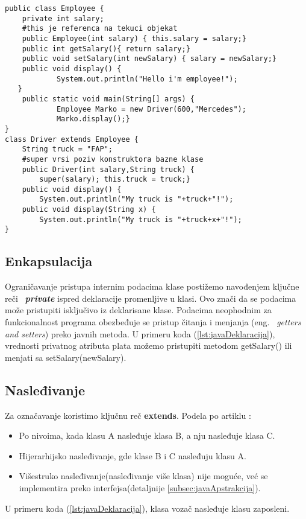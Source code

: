 \documentclass[a4paper]{article}
\begin{document}
\begin{lstlisting}[caption={Primer deklarisanja klase sa enkapsulacijom i nasleđivanjem},frame=single, label=lst:javaDeklaracija]
public class Employee {
	private int salary;
	#this je referenca na tekuci objekat
	public Employee(int salary) { this.salary = salary;}
 	public int getSalary(){ return salary;}
	public void setSalary(int newSalary) { salary = newSalary;}
	public void display() {
     		System.out.println("Hello i'm employee!");
   }
	public static void main(String[] args) {
    		Employee Marko = new Driver(600,"Mercedes");
    		Marko.display();}    
}
class Driver extends Employee {
  	String truck = "FAP";
	#super vrsi poziv konstruktora bazne klase
   	public Driver(int salary,String truck) {
		super(salary); this.truck = truck;}
  	public void display() {
		System.out.println("My truck is "+truck+"!");
	public void display(String x) {
		System.out.println("My truck is "+truck+x+"!");
}
\end{lstlisting}
\subsection{Enkapsulacija}
\label{subsec:javaEnkapsulacija}

Ograničavanje pristupa internim podacima klase postižemo navođenjem ključne reči ~{\em \textbf{private}} ispred deklaracije promenljive u klasi. Ovo znači da se podacima može pristupiti isključivo iz deklarisane klase. Podacima neophodnim za funkcionalnost programa obezbeđuje se pristup čitanja i menjanja (eng. ~{\em getters and setters})\cite{horstmann2017core} preko javnih metoda. U primeru koda (\ref{lst:javaDeklaracija}), vrednosti privatnog atributa plata možemo pristupiti metodom getSalary() ili menjati sa setSalary(newSalary).

\subsection{Nasleđivanje}
\label{subsec:javaNasledjivanje}

Za označavanje koristimo ključnu reč \textbf{extends}. Podela po artiklu \cite{oopJava}:
\begin{itemize}
  \item Po nivoima, kada klasu A nasleđuje klasa B, a nju nasleđuje klasa C.
  \item Hijerarhijsko nasleđivanje, gde klase B i C nasleđuju klasu A.
  \item Višestruko nasleđivanje(nasleđivanje više klasa) nije moguće, već se implementira preko interfejsa(detaljnije \ref{subsec:javaApstrakcija}).
\end{itemize}
U primeru koda (\ref{lst:javaDeklaracija}), klasa vozač nasleđuje klasu zaposleni.
\end{document}
